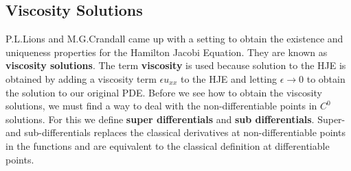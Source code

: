 \noindent
\subsection{Viscosity Solutions}
P.L.Lions and M.G.Crandall\cite{lions} came up with a setting to obtain the
existence and uniqueness properties for the Hamilton Jacobi
Equation. They are known as \textbf{viscosity solutions}. The term
\textbf{viscosity} is used because solution to the HJE is obtained by
adding a viscosity term $\epsilon u_{xx}$ to the HJE and letting
$\epsilon \to 0$ to obtain the solution to our original PDE. Before we
see how to obtain the viscosity solutions, we must find a way to deal
with the non-differentiable points in $C^0$ solutions. For this we
define \textbf{super differentials} and \textbf{sub
  differentials}. Super- and sub-differentials replaces the classical
derivatives at non-differentiable points in the functions and are
equivalent to the classical definition at differentiable points.

